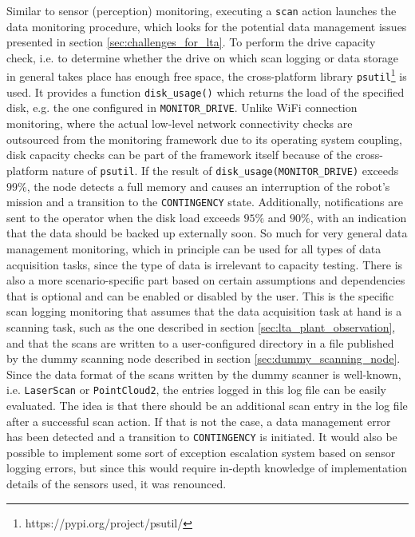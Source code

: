 \documentclass[english, master, utf8]{base/thesis_KBS}
\newcommand{\code}[1]{\colorbox{light-gray}{\texttt{#1}}}
\begin{document}
Similar to sensor (perception) monitoring, executing a \code{scan} action launches the data monitoring procedure, which looks for the potential data management issues presented in
section \ref{sec:challenges_for_lta}. To perform the drive capacity check, i.e. to determine whether the drive on which scan logging or data storage in general takes place has enough
free space, the cross-platform library \code{psutil}\footnote{https://pypi.org/project/psutil/} is used. It provides a function \code{disk\_usage()} which returns the load of the
specified disk, e.g. the one configured in \code{MONITOR\_DRIVE}. Unlike WiFi connection monitoring, where the actual low-level network connectivity checks are outsourced
from the monitoring framework due to its operating system coupling, disk capacity checks can be part of the framework itself because of the cross-platform nature of \code{psutil}.
If the result of \code{disk\_usage(MONITOR\_DRIVE)} exceeds $99\%$, the node detects a full memory and causes an interruption of the robot's mission and a transition to the
\code{CONTINGENCY} state. Additionally, notifications are sent to the operator when the disk load exceeds $95\%$ and $90\%$, with an indication that the data should be backed up
externally soon. So much for very general data management monitoring, which in principle can be used for all types of data acquisition tasks, since the type of data is irrelevant
to capacity testing. There is also a more scenario-specific part based on certain assumptions and dependencies that is optional and can be enabled or disabled by the user.
This is the specific scan logging monitoring that assumes that the data acquisition task at hand is a scanning task, such as the one described in section
\ref{sec:lta_plant_observation}, and that the scans are written to a user-configured directory in a file published by the dummy scanning node described in section
\ref{sec:dummy_scanning_node}. Since the data format of the scans written by the dummy scanner is well-known, i.e. \code{LaserScan} or \code{PointCloud2}, the entries logged in
this log file can be easily evaluated. The idea is that there should be an additional scan entry in the log file after a successful scan action. If that is not the case,
a data management error has been detected and a transition to \code{CONTINGENCY} is initiated. It would also be possible to implement some sort of exception escalation system
based on sensor logging errors, but since this would require in-depth knowledge of implementation details of the sensors used, it was renounced.\newline
\end{document}

